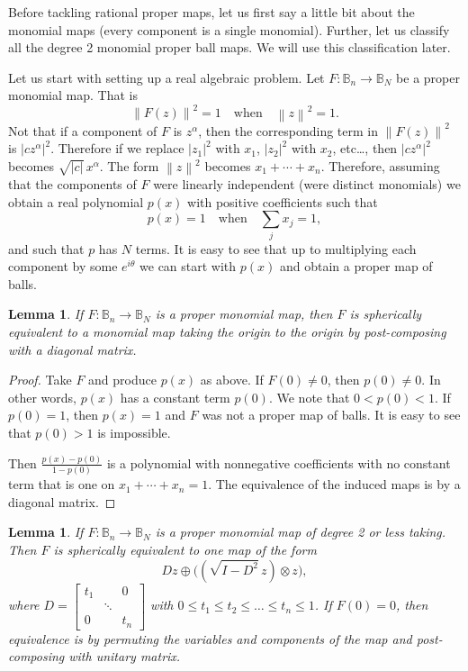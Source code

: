 \documentclass[12pt,openany]{book}
\newcommand{\abs}[1]{\left\lvert {#1} \right\rvert}
\newcommand{\norm}[1]{\left\lVert {#1} \right\rVert}
\newcommand{\bB}{{\mathbb{B}}}
\theoremstyle{plain}
\newtheorem{lemma}[thm]{Lemma}
\theoremstyle{remark}
\theoremstyle{definition}
\theoremstyle{exercise}
\theoremstyle{example}
\begin{document}
Before tackling rational proper maps, let us first say a little bit about the
monomial maps (every component is a single monomial).  Further, let us
classify all the degree 2 monomial proper ball maps.  We will use this
classification later.

Let us start with setting up a real algebraic problem.  Let
$F \colon \bB_n \to \bB_N$ be a proper monomial map.  That is
\begin{equation}
\norm{F(z)}^2 = 1 \quad \text{when} \quad  \norm{z}^2  = 1.
\end{equation}
Not that if a component of $F$ is $z^\alpha$, then
the corresponding term in $\norm{F(z)}^2$ is $\abs{c z^\alpha}^2$.
Therefore if we replace
$\abs{z_1}^2$ with $x_1$,
$\abs{z_2}^2$ with $x_2$, etc\ldots,
then $\abs{c z^\alpha}^2$ becomes $\sqrt{\abs{c}}\,x^\alpha$.  The form
$\norm{z}^2$ becomes $x_1 + \cdots + x_n$.  Therefore, assuming that the
components of $F$ were linearly independent (were distinct monomials) we
obtain a real polynomial $p(x)$ with positive coefficients such that
\begin{equation}
p(x) = 1 \quad \text{when} \quad  \sum_j x_j  = 1,
\end{equation}
and such that $p$ has $N$ terms.  It is easy to see that up to multiplying
each component by some
$e^{i\theta}$ we can start with $p(x)$ and obtain a proper
map of balls.

\begin{lemma}
If $F \colon \bB_n \to \bB_N$ is a proper monomial map, then
$F$ is spherically equivalent to a monomial map
taking the origin to the origin by post-composing with
a diagonal matrix.
\end{lemma}

\begin{proof}
Take $F$ and produce $p(x)$ as above.  If $F(0) \not = 0$, then
$p(0) \not= 0$.  In other words, $p(x)$ has a constant term $p(0)$.
We note that $0 < p(0) < 1$.  If $p(0) = 1$, then $p(x) = 1$ and $F$
was not a proper map of balls.  It is easy to see that $p(0) > 1$ is
impossible.

Then $\frac{p(x)-p(0)}{1-p(0)}$ is a
polynomial with nonnegative coefficients with no constant term that is one
on $x_1+\cdots+x_n = 1$.  The equivalence of the induced maps is by a
diagonal matrix.
\end{proof}

\begin{lemma}
If $F \colon \bB_n \to \bB_N$ is a proper monomial map of degree 2 or less
taking.  Then $F$ is spherically equivalent to one map
of the form
\begin{equation}
D z \oplus \bigl( ( \sqrt{I-D^2} \, z ) \otimes z \bigr) ,
\end{equation}
where $D =
\left[
\begin{smallmatrix}
t_1 & & 0 \\
 & \ddots & \\
0 & & t_n
\end{smallmatrix}
\right]$
with $0 \leq t_1 \leq t_2 \leq \ldots \leq t_n \leq 1$.
If $F(0) = 0$, then
equivalence is by permuting the variables and 
components of the map and 
post-composing with unitary matrix.
\end{lemma}
\end{document}
